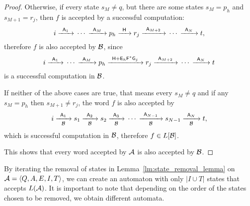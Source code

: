 \begin{proof}
    Otherwise, if every state $s_M \neq q$, but there are some states $s_M = p_h$ and $s_{M+1} = r_j$, then $f$ is accepted by a successful computation:
    \[
        i {\; \xrightarrow[]{\: \; {\mathsf{A}}_1 \: \;} \;} \dotsm {\; \xrightarrow[]{\: \; {\mathsf{A}}_M \: \;} \;} p_h {\; \xrightarrow[]{\: \; {\mathsf{H}} \: \;} \;} r_j {\; \xrightarrow[]{\: \; {\mathsf{A}}_{M+2} \: \;} \;} \dotsm {\; \xrightarrow[]{\: \; {\mathsf{A}}_N \: \;} \;} t,
    \]
    therefore $f$ is also accepted by ${\mathcal{B}}$, since
    \[
        i {\; \xrightarrow[]{\: \; {\mathsf{A}}_1 \: \;} \;} \dotsm {\; \xrightarrow[]{\: \; {\mathsf{A}}_M \: \;} \;} p_h {\; \xrightarrow[]{\: \; {\mathsf{H}} + {\mathsf{E}}_h{\mathsf{F}}^*{\mathsf{G}}_j \: \;} \;} r_j {\; \xrightarrow[]{\: \; {\mathsf{A}}_{M+2} \: \;} \;} \dotsm {\; \xrightarrow[]{\: \; {\mathsf{A}}_N \: \;} \;} t
    \]
    is a successful computation in ${\mathcal{B}}$.

    If neither of the above cases are true, that means every $s_M \neq q$ and if any $s_M = p_h$ then $s_{M+1} \neq r_j$, the word $f$ is also accepted by
    \[
        i {\; \xrightarrow[{\mathcal{B}}]{\: \; {\mathsf{A}}_1 \: \;} \;} s_1 {\; \xrightarrow[{\mathcal{B}}]{\: \; {\mathsf{A}}_2 \: \;} \;} s_2 {\; \xrightarrow[{\mathcal{B}}]{\: \; {\mathsf{A}}_3 \: \;} \;} \dotsm {\; \xrightarrow[{\mathcal{B}}]{\: \; {\mathsf{A}}_{N-1} \: \;} \;} s_{N-1} {\; \xrightarrow[{\mathcal{B}}]{\: \; {\mathsf{A}}_N \: \;} \;} t,
    \]
    which is successful computation in ${\mathcal{B}}$, therefore $f \in L[{\mathcal{B}}]$.

    This shows that every word accepted by ${\mathcal{A}}$ is also accepted by ${\mathcal{B}}$.
\end{proof}

By iterating the removal of states in Lemma~\ref*{lm:state_removal_lemma} on ${\mathcal{A}} = \langle Q, A, E, I, T \rangle$, we can create an automaton with only $|I \cup T|$ states that accepts $L({\mathcal{A}})$. It is important to note that depending on the order of the states chosen to be removed, we obtain different automata.